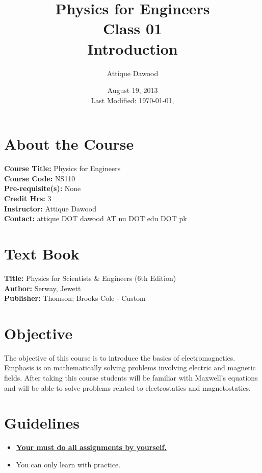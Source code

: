 \documentclass[12pt,a4paper]{article}
\title{\vspace{-2cm}Physics for Engineers\\Class 01\\Introduction}
\author{Attique Dawood}
\date{August 19, 2013\\[0.2cm] Last Modified: \today, \currenttime}
\begin{document}
\maketitle
\section{About the Course}
\textbf{Course Title:} Physics for Engineers\\
\textbf{Course Code:} NS110\\
\textbf{Pre-requisite(s):} None\\
\textbf{Credit Hrs:} 3\\
\textbf{Instructor:} Attique Dawood\\
\textbf{Contact:} attique DOT dawood AT nu DOT edu DOT pk\\
\section{Text Book}
\textbf{Title:} Physics for Scientists \& Engineers  (6th Edition)\\
\textbf{Author:} Serway, Jewett\\
\textbf{Publisher:} Thomson; Brooks Cole - Custom\\
\section{Objective}
The objective of this course is to introduce the basics of electromagnetics. Emphasis is on mathematically solving problems involving electric and magnetic fields. After taking this course students will be familiar with Maxwell’s equations and will be able to solve problems related to electrostatics and magnetostatics.
\section{Guidelines}
\begin{itemize}
\item \textbf{\underline{Your must do all assignments by yourself.}}
\item You can only learn with practice.
\end{itemize}
\end{document}
